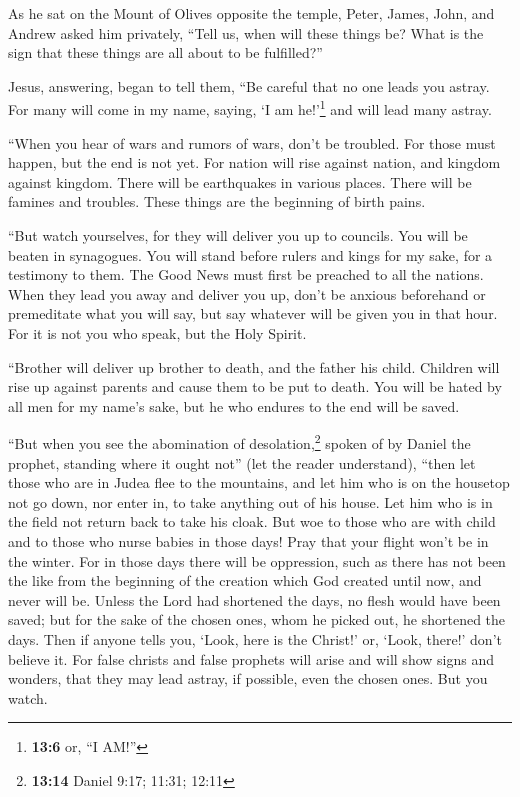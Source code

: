  As he sat on the Mount of Olives opposite the temple,
Peter, James, John, and Andrew asked him privately, 
``Tell us, when will these things be? What is the sign that these things
are all about to be fulfilled?''

 Jesus, answering, began to tell them, ``Be careful that
no one leads you astray.  For many will come in my name,
saying, `I am he!'\footnote{\textbf{13:6} or, ``I AM!''} and will lead
many astray.

 ``When you hear of wars and rumors of wars, don't be
troubled. For those must happen, but the end is not yet. 
For nation will rise against nation, and kingdom against kingdom. There
will be earthquakes in various places. There will be famines and
troubles. These things are the beginning of birth pains.

 ``But watch yourselves, for they will deliver you up to
councils. You will be beaten in synagogues. You will stand before rulers
and kings for my sake, for a testimony to them.  The Good
News must first be preached to all the nations.  When
they lead you away and deliver you up, don't be anxious beforehand or
premeditate what you will say, but say whatever will be given you in
that hour. For it is not you who speak, but the Holy Spirit.

 ``Brother will deliver up brother to death, and the
father his child. Children will rise up against parents and cause them
to be put to death.  You will be hated by all men for my
name's sake, but he who endures to the end will be saved.

 ``But when you see the abomination of
desolation,\footnote{\textbf{13:14} Daniel 9:17; 11:31; 12:11} spoken of
by Daniel the prophet, standing where it ought not'' (let the reader
understand), ``then let those who are in Judea flee to the mountains,
 and let him who is on the housetop not go down, nor
enter in, to take anything out of his house.  Let him who
is in the field not return back to take his cloak.  But
woe to those who are with child and to those who nurse babies in those
days!  Pray that your flight won't be in the winter.
 For in those days there will be oppression, such as
there has not been the like from the beginning of the creation which God
created until now, and never will be.  Unless the Lord
had shortened the days, no flesh would have been saved; but for the sake
of the chosen ones, whom he picked out, he shortened the days.
 Then if anyone tells you, `Look, here is the Christ!'
or, `Look, there!' don't believe it.  For false christs
and false prophets will arise and will show signs and wonders, that they
may lead astray, if possible, even the chosen ones.  But
you watch.

